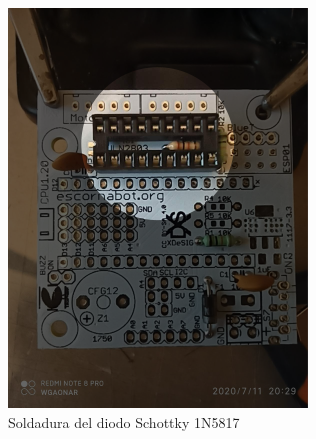 \documentclass{article}
\begin{document}
\begin{figure}[H]
    \centering
    \begin{subfigure}[t]{0.3\textwidth}
        \centering
        \includegraphics[width=0.9\columnwidth, height=1.2\columnwidth]{images/CPU/cpu_zocalo_1.png}
        \caption{Soldadura del diodo Schottky 1N5817}
        \label{fig:cpu_zocalo_1}
    \end{subfigure}%
    \begin{subfigure}[t]{0.3\textwidth}
        \centering

\end{subfigure}
\end{figure}
\end{document}
